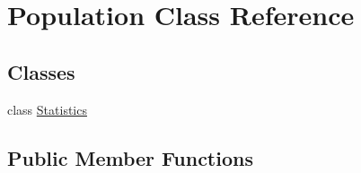 \hypertarget{class_population}{}\section{Population Class Reference}
\label{class_population}
\subsection*{Classes}
\begin{DoxyCompactItemize}
\item 
class \hyperlink{class_population_1_1_statistics}{Statistics}
\end{DoxyCompactItemize}
\subsection*{Public Member Functions}
